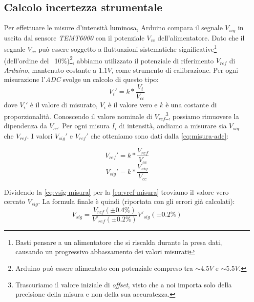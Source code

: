 \subsection{Calcolo incertezza strumentale}\label{subsec:calcolo-incertezza-strumentale}
  Per effettuare le misure d'intensità luminosa, Arduino compara
  il segnale $V_{sig}$ in uscita dal sensore \emph{TEMT6000} con il potenziale
  $V_{cc}$ dell'alimentatore.
  Dato che il segnale $V_{cc}$ può essere soggetto a fluttuazioni sistematiche significative\footnote{Basti pensare a un alimentatore che si riscalda durante la presa dati,
  causando un progressivo abbassamento dei valori misurati}
  (dell'ordine del ~10\%)\footnote{Arduino può essere alimentato con potenziale compreso tra $\sim 4.5V$ e $\sim 5.5V$.}, abbiamo utilizzato il potenziale di riferimento
  $V_{ref}$ di \emph{Arduino}, mantenuto costante a $1.1V$, come strumento di
  calibrazione.
  Per ogni misurazione l'\emph{ADC} svolge un calcolo di questo tipo:
  \begin{equation}
    V_i' = k * \frac {V_i} {V_{cc}}
    \label{eq:misura-adc}
  \end{equation}
  \noindent dove $V_i'$ è il valore di misurato, $V_i$ è il valore vero e $k$
  è una costante di proporzionalità. Conoscendo il valore nominale
  di $V_{ref}$\footnote{Trascuriamo il valore iniziale di \emph{offset}, visto che
  a noi importa solo della precisione della misura e non della sua accuratezza.}, possiamo rimuovere la
  dipendenza da $V_{cc}$. Per ogni misura $I_i$ di intensità, andiamo a misurare sia $V_{sig}$ che $V_{ref}$.
  I valori $V_{sig}'$ e $V_{ref}'$ che otteniamo sono dati dalla \eqref{eq:misura-adc}:
  \vspace{-10mm}
  \begin{multicols}{2}
    \begin{equation}
      V_{ref}' = k * \frac {V_{ref}} {V_{cc}}
      \label{eq:vref-misura}
    \end{equation}
  \break
    \begin{equation}
      V_{sig}' = k * \frac {V_{sig}} {V_{cc}}
      \label{eq:vsig-misura}
    \end{equation}
  \end{multicols}
  \noindent Dividendo la \eqref{eq:vsig-misura} per la \eqref{eq:vref-misura} troviamo il valore vero cercato $V_{sig}$.
  La formula finale è quindi (riportata con gli errori già calcolati):
  \begin{equation}
    V_{sig} = \frac {
      V_{ref} (\pm 0.4\%)
    } {
      V'_{ref} (\pm 0.2\%)
    } V'_{sig} (\pm 0.2\%)
    \label{eq:misura-intensità}
  \end{equation}
